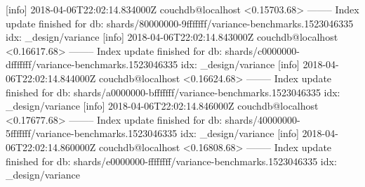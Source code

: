 [info] 2018-04-06T22:02:14.834000Z couchdb@localhost <0.15703.68> -------- Index update finished for db: shards/80000000-9fffffff/variance-benchmarks.1523046335 idx: _design/variance
[info] 2018-04-06T22:02:14.843000Z couchdb@localhost <0.16617.68> -------- Index update finished for db: shards/c0000000-dfffffff/variance-benchmarks.1523046335 idx: _design/variance
[info] 2018-04-06T22:02:14.844000Z couchdb@localhost <0.16624.68> -------- Index update finished for db: shards/a0000000-bfffffff/variance-benchmarks.1523046335 idx: _design/variance
[info] 2018-04-06T22:02:14.846000Z couchdb@localhost <0.17677.68> -------- Index update finished for db: shards/40000000-5fffffff/variance-benchmarks.1523046335 idx: _design/variance
[info] 2018-04-06T22:02:14.860000Z couchdb@localhost <0.16808.68> -------- Index update finished for db: shards/e0000000-ffffffff/variance-benchmarks.1523046335 idx: _design/variance


